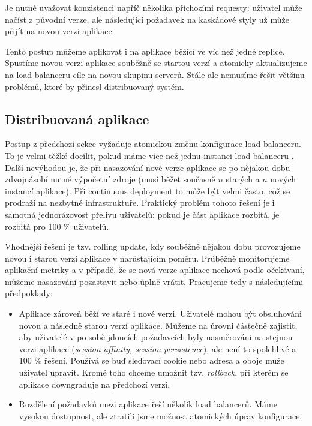             Je nutné uvažovat konzistenci napříč několika příchozími \HTTP requesty: uživatel může načíst \HTML z původní verze, ale následující \HTTP požadavek na kaskádové styly už může přijít na novou verzi aplikace.

            Tento postup můžeme aplikovat i na aplikace běžící ve víc než jedné replice. Spustíme novou verzi aplikace souběžně se startou verzí a atomicky aktualizujeme na load balanceru cíle na novou skupinu serverů. Stále ale nemusíme řešit většinu problémů, které by přinesl distribuovaný systém.

        \subsection{Distribuovaná aplikace}
            \label{distributed-apps}
            Postup z předchozí sekce vyžaduje atomickou změnu konfigurace load balanceru. To je velmi těžké docílit, pokud máme více než jednu instanci load balanceru . Další nevýhodou je, že při nasazování nové verze aplikace se po nějakou dobu zdvojnásobí nutné výpočetní zdroje (musí běžet současně $n$ starých a $n$ nových instancí aplikace). Při continuous deployment to může být velmi často, což se prodraží na nezbytné infrastruktuře. Praktický problém tohoto řešení je i samotná jednorázovost přelivu uživatelů: pokud je část aplikace rozbitá, je rozbitá pro 100 \% uživatelů.

            Vhodnější řešení je tzv. rolling update, kdy souběžně nějakou dobu provozujeme novou i starou verzi aplikace v narůstajícím poměru. Průběžně monitorujeme aplikační metriky a v případě, že se nová verze aplikace nechová podle očekávaní, můžeme nasazování pozastavit nebo úplně vrátit. Pracujeme tedy s následujícími předpoklady:
            \begin{itemize}
                \item Aplikace zároveň běží ve staré i nové verzi. Uživatelé mohou být obsluhováni novou a následně starou verzí aplikace.  Můžeme na úrovni  částečně zajistit, aby uživatelé v po sobě jdoucích požadavcích byly nasměrování na stejnou verzi aplikace (\textit{session affinity, session persistence}), ale není to spolehlivé a 100 \% řešení. Používá se buď sledovací cookie nebo  adresa a oboje může uživatel upravit. Kromě toho chceme umožnit tzv. \textit{rollback}, při kterém se aplikace downgraduje na předchozí verzi.
                \item Rozdělení požadavků mezi aplikace řeší několik load balancerů. Máme vysokou dostupnost, ale ztratili jsme možnost atomických úprav konfigurace.
            \end{itemize}


